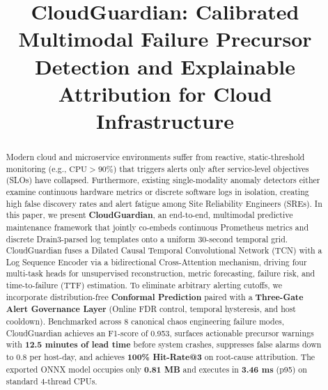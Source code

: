 \documentclass[conference]{IEEEtran}
\begin{document}
\title{CloudGuardian: Calibrated Multimodal Failure Precursor Detection and Explainable Attribution for Cloud Infrastructure}

\author{
}

\maketitle

\begin{abstract}
Modern cloud and microservice environments suffer from reactive, static-threshold monitoring (e.g., $\text{CPU} > 90\%$) that triggers alerts only after service-level objectives (SLOs) have collapsed. Furthermore, existing single-modality anomaly detectors either examine continuous hardware metrics or discrete software logs in isolation, creating high false discovery rates and alert fatigue among Site Reliability Engineers (SREs). In this paper, we present \textbf{CloudGuardian}, an end-to-end, multimodal predictive maintenance framework that jointly co-embeds continuous Prometheus metrics and discrete Drain3-parsed log templates onto a uniform 30-second temporal grid. CloudGuardian fuses a Dilated Causal Temporal Convolutional Network (TCN) with a Log Sequence Encoder via a bidirectional Cross-Attention mechanism, driving four multi-task heads for unsupervised reconstruction, metric forecasting, failure risk, and time-to-failure (TTF) estimation. To eliminate arbitrary alerting cutoffs, we incorporate distribution-free \textbf{Conformal Prediction} paired with a \textbf{Three-Gate Alert Governance Layer} (Online FDR control, temporal hysteresis, and host cooldown). Benchmarked across 8 canonical chaos engineering failure modes, CloudGuardian achieves an F1-score of 0.953, surfaces actionable precursor warnings with \textbf{12.5 minutes of lead time} before system crashes, suppresses false alarms down to 0.8 per host-day, and achieves \textbf{100\% Hit-Rate@3} on root-cause attribution. The exported ONNX model occupies only \textbf{0.81 MB} and executes in \textbf{3.46 ms} (p95) on standard 4-thread CPUs.
\end{abstract}
\end{document}
